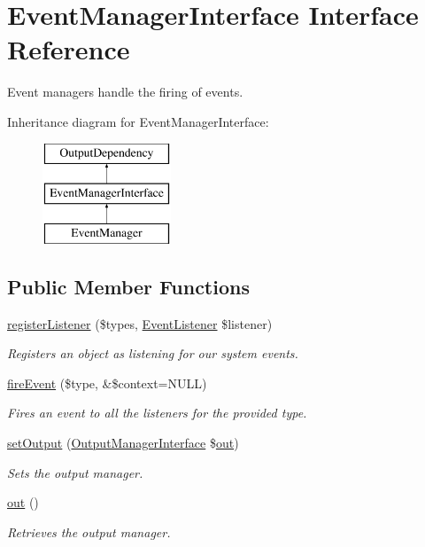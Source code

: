\hypertarget{interfaceEventManagerInterface}{\section{Event\-Manager\-Interface Interface Reference}
\label{interfaceEventManagerInterface}
}


Event managers handle the firing of events.  


Inheritance diagram for Event\-Manager\-Interface\-:\begin{figure}[H]
\begin{center}
\leavevmode
\includegraphics[height=3.000000cm]{interfaceEventManagerInterface}
\end{center}
\end{figure}
\subsection*{Public Member Functions}
\begin{DoxyCompactItemize}
\item 
\hyperlink{interfaceEventManagerInterface_a660aec7d823ae3daa091b6d76568fa90}{register\-Listener} (\$types, \hyperlink{interfaceEventListener}{Event\-Listener} \$listener)
\begin{DoxyCompactList}\small\item\em Registers an object as listening for our system events. \end{DoxyCompactList}\item 
\hyperlink{interfaceEventManagerInterface_a56a99eb63ca41d0380bbb633ea38013c}{fire\-Event} (\$type, \&\$context=N\-U\-L\-L)
\begin{DoxyCompactList}\small\item\em Fires an event to all the listeners for the provided type. \end{DoxyCompactList}\item 
\hyperlink{interfaceOutputDependency_af915894ca0a2985f759834517861ce9d}{set\-Output} (\hyperlink{interfaceOutputManagerInterface}{Output\-Manager\-Interface} \$\hyperlink{interfaceOutputDependency_aaae940f994ba7252d2ae5163b5fa97eb}{out})
\begin{DoxyCompactList}\small\item\em Sets the output manager. \end{DoxyCompactList}\item 
\hyperlink{interfaceOutputDependency_aaae940f994ba7252d2ae5163b5fa97eb}{out} ()
\begin{DoxyCompactList}\small\item\em Retrieves the output manager. \end{DoxyCompactList}\end{DoxyCompactItemize}


